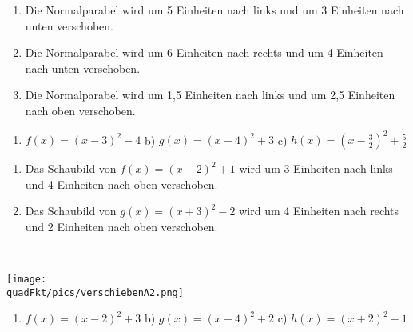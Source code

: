 \begin{Exercise}[title={Stelle jeweils die Funktionsgleichung auf und skizziere das Schaubild}, label=verschiebenA2]
	\begin{enumerate}[label=\alph*)]
		\item Die Normalparabel wird um 5 Einheiten nach links und um 3 Einheiten nach unten verschoben.
		\item Die Normalparabel wird um 6 Einheiten nach rechts und um 4 Einheiten nach unten verschoben.
		\item Die Normalparabel wird um 1,5 Einheiten nach links und um 2,5 Einheiten nach oben verschoben.
	\end{enumerate}
\end{Exercise}
\begin{Exercise}[title={Beschreibe wie man die Normalparabel verschieben muss und skizziere das Schaubild}, label=verschiebenA3]
	\begin{enumerate}[label=\alph*)]
		\item \(f(x)=(x-3)^2-4\) \quad b) \(g(x)=(x+4)^2+3\) \quad c) \(h(x)=\left(x-\tfrac{3}{2}\right)^2+\tfrac{5}{2}\)
	\end{enumerate}
\end{Exercise}
\begin{Exercise}[title={Stelle die Funktionsgleichung auf}, label=verschiebenA4]
	\begin{enumerate}[label=\alph*)]
		\item Das Schaubild von \(f(x)=(x-2)^2+1\) wird um 3 Einheiten nach links und 4 Einheiten nach oben verschoben.
		\item Das Schaubild von \(g(x)=(x+3)^2-2\) wird um 4 Einheiten nach rechts und 2 Einheiten nach oben verschoben.
	\end{enumerate}
\end{Exercise}\newpage
\begin{Answer}[ref=verschiebenA1]\\
	\begin{minipage}{\linewidth}\centering
		\texttt{[image: \\quadFkt/pics/verschiebenA2.png]}
	\end{minipage}\vspace{.1cm}
	\begin{enumerate}[label=\alph*)]
		\item \(f(x)=\left(x-2\right)^2+3\) \quad b) \(g(x)=\left(x+4\right)^2+2\) \quad c) \(h(x)=\left(x+2\right)^2-1\)
	\end{enumerate}
\end{Answer}

